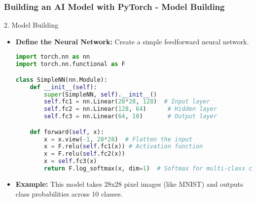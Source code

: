 \documentclass[aspectratio=169]{beamer}
\begin{document}
\begin{frame}[fragile]
    \frametitle{Building an AI Model with PyTorch - Model Building}
    \begin{block}{2. Model Building}
        \begin{itemize}
            \item \textbf{Define the Neural Network:}
            Create a simple feedforward neural network.
            \begin{lstlisting}[language=Python]
import torch.nn as nn
import torch.nn.functional as F

class SimpleNN(nn.Module):
    def __init__(self):
        super(SimpleNN, self).__init__()
        self.fc1 = nn.Linear(28*28, 128)  # Input layer
        self.fc2 = nn.Linear(128, 64)      # Hidden layer
        self.fc3 = nn.Linear(64, 10)       # Output layer

    def forward(self, x):
        x = x.view(-1, 28*28)  # Flatten the input
        x = F.relu(self.fc1(x)) # Activation function
        x = F.relu(self.fc2(x))
        x = self.fc3(x)
        return F.log_softmax(x, dim=1)  # Softmax for multi-class classification
            \end{lstlisting}
            \item \textbf{Example:}
            This model takes 28x28 pixel images (like MNIST) and outputs class probabilities across 10 classes.
        \end{itemize}
    \end{block}
\end{frame}
\end{document}
